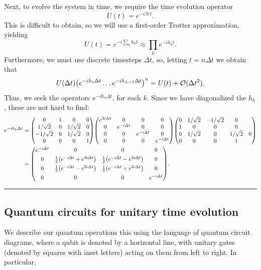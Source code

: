 \documentclass[10pt]{amsart}
\theoremstyle{definition}
\newcommand{\Prod}{\ensuremath{\displaystyle\prod}}        %
\newcommand{\Ham}{\ensuremath{\mathcal{H}}}                %
\newcommand{\Ord}{\ensuremath{\mathcal{O}}}                %
\newcommand\separator{\vspace{1em}\hrule \vspace{1em}}
\begin{document}
Next, to evolve the system in time, we require the time evolution operator
\[ U(t) = e^{-i \Ham t}. \]
This is difficult to obtain, so we will use a first-order Trotter approximation,
yielding
\[ U(t) = e^{-i \sum_k h_k t} \approx \Prod_{k} e^{-i h_k t}. \]
Furthermore, we must use discrete timesteps $\Delta t$, so, letting 
$t = n \Delta t$ we obtain that
\[ 
  U(\Delta t) \qty(e^{-ih_1\Delta t} \dots e^{-ih_{L-1}\Delta t})^n 
    = U(t) + \Ord(\Delta t^2).
\]
Thus, we seek the operators $e^{-i h_k \Delta t}$, for each $k$. Since we have
diagonalized the $h_k$, these are not hard to find:
\begin{align*}
  e^{-i h_k \Delta t}
   &= \mqty(0 & 1 & 0 & 0 \\ 1/\sqrt{2} & 0 & 1/\sqrt{2} & 0 \\
            -1/\sqrt{2} & 0 & 1/\sqrt{2} & 0 \\ 0 & 0 & 0 & 1)
      \mqty(e^{3i\Delta t} & 0 & 0 & 0 \\ 0 & e^{-i\Delta t} & 0 & 0 \\ 
              0 & 0 & e^{-i\Delta t} & 0 \\ 0 & 0 & 0 & e^{-i\Delta t})
      \mqty(0 & 1/\sqrt{2} & -1/\sqrt{2} & 0 \\ 1 & 0 & 0 & 0 \\
            0 & 1/\sqrt{2} & 0 & 1/\sqrt{2} & 0 \\ 0 & 0 & 0 & 1) \\
  &= \mqty(e^{-i \Delta t} & 0 & 0 & 0 \\[4pt] 
           0 & \frac12\qty(e^{-i \Delta t} + e^{3i \Delta t}) & 
               \frac12\qty(e^{-i \Delta t} - e^{3i \Delta t}) & 0 \\[4pt]
           0 & \frac12\qty(e^{-i \Delta t} - e^{3i \Delta t}) & 
               \frac12\qty(e^{-i \Delta t} + e^{3i \Delta t}) & 0 \\[4pt]
           0 & 0 & 0 & e^{-i \Delta t}).
\end{align*}

\separator


\subsection{Quantum circuits for unitary time evolution} \label{subsec:udt}

We describe our quantum operations this using the language
of quantum circuit diagrams, where a qubit is denoted by a horizontal line, with
unitary gates (denoted by squares with inset letters) acting on them from left
to right. In particular,
\end{document}
